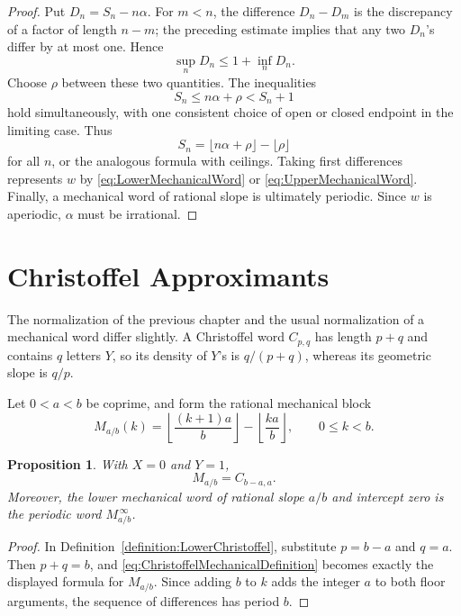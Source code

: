 \documentclass{book}
\newtheorem{proposition}[definition]{Proposition}
\begin{document}
\begin{proof}
  Put \(D_n=S_n-n\alpha\).  For \(m<n\), the difference
  \(D_n-D_m\) is the discrepancy of a factor of length \(n-m\); the
  preceding estimate implies that any two \(D_n\)'s differ by at most
  one.  Hence
  \[
    \sup_nD_n\leq1+\inf_nD_n.
  \]
  Choose \(\rho\) between these two quantities.  The inequalities
  \[
    S_n\leq n\alpha+\rho<S_n+1
  \]
  hold simultaneously, with one consistent choice of open or closed
  endpoint in the limiting case.  Thus
  \[
    S_n=\lfloor n\alpha+\rho\rfloor-\lfloor\rho\rfloor
  \]
  for all \(n\), or the analogous formula with ceilings.  Taking first
  differences represents \(w\) by
  \eqref{eq:LowerMechanicalWord} or \eqref{eq:UpperMechanicalWord}.
  Finally, a mechanical word of rational slope is ultimately periodic.
  Since \(w\) is aperiodic, \(\alpha\) must be irrational.
\end{proof}

\section{Christoffel Approximants}

The normalization of the previous chapter and the usual normalization of a
mechanical word differ slightly.  A Christoffel word \(C_{p,q}\) has length
\(p+q\) and contains \(q\) letters \(Y\), so its density of \(Y\)'s is
\(q/(p+q)\), whereas its geometric slope is \(q/p\).

Let \(0<a<b\) be coprime, and form the rational mechanical block
\[
  M_{a/b}(k)
  =\left\lfloor\frac{(k+1)a}{b}\right\rfloor
   -\left\lfloor\frac{ka}{b}\right\rfloor,
  \qquad 0\leq k<b.
\]

\begin{proposition}\label{proposition:RationalMechanicalChristoffel}
  With \(X=0\) and \(Y=1\),
  \[
    M_{a/b}=C_{b-a,a}.
  \]
  Moreover, the lower mechanical word of rational slope \(a/b\) and
  intercept zero is the periodic word \(M_{a/b}^{\,\infty}\).
\end{proposition}
\begin{proof}
  In Definition~\ref{definition:LowerChristoffel}, substitute
  \(p=b-a\) and \(q=a\).  Then \(p+q=b\), and
  \eqref{eq:ChristoffelMechanicalDefinition} becomes exactly the displayed
  formula for \(M_{a/b}\).  Since adding \(b\) to \(k\) adds the integer
  \(a\) to both floor arguments, the sequence of differences has period
  \(b\).
\end{proof}
\end{document}
